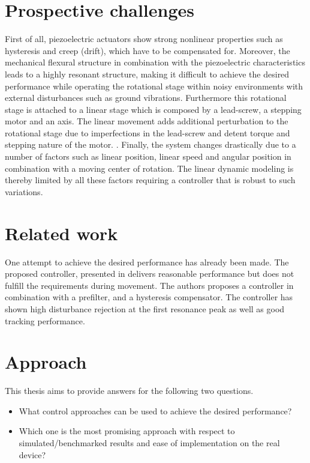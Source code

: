 \section{Prospective challenges}\label{sec:prospectiveChallanges}
First of all, piezoelectric actuators show strong nonlinear properties such as hysteresis and creep (drift), which have to be compensated for.\citep{Piezo:2008} Moreover, the mechanical flexural structure in combination with the piezoelectric characteristics leads to a highly resonant structure, making it difficult to achieve the desired performance while operating the rotational stage within noisy environments with external disturbances such as ground vibrations. Furthermore this rotational stage is attached to a linear stage which is composed by a lead-screw, a stepping motor and an axis. The linear movement adds additional perturbation to the rotational stage due to imperfections in the lead-screw and detent torque and stepping nature of the motor. \citep{ButcherController:2015}. Finally, the system changes drastically due to a number of factors such as linear position, linear speed and angular position in combination with a moving center of rotation. The linear dynamic modeling is thereby limited by all these factors requiring a controller that is robust to such variations.

\section{Related work}
One attempt to achieve the desired performance has already been made. The proposed controller, presented in \citep{ButcherController:2015} delivers reasonable performance but does not fulfill the requirements during movement. The authors proposes a \abbrPID controller in combination with a prefilter, and a hysteresis compensator. The controller has shown high disturbance rejection at the first resonance peak as well as good tracking performance.

\section{Approach}
This thesis aims to provide answers for the following two questions.

\begin{itemize}
  \item What control approaches can be used to achieve the desired performance?
  \item Which one is the most promising approach with respect to simulated/benchmarked results and ease of implementation on the real device?
\end{itemize}

